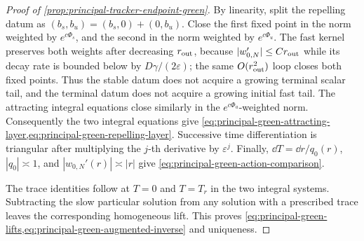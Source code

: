 \begin{proof}[Proof of \cref{prop:principal-tracker-endpoint-green}]
By linearity, split the repelling datum as
\((b_s,b_u)=(b_s,0)+(0,b_u)\).  Close the first fixed point in the norm
weighted by \(e^{c\Phi_s}\), and the second in the norm weighted by
\(e^{c\Phi_u}\).  The fast kernel preserves both weights after decreasing
\(r_{\rm out}\), because
\(|w_{0,N}'|\le C r_{\rm out}\) while its decay rate is bounded below by
\(D\gamma/(2\varepsilon)\); the same
\(O(r_{\rm out}^2)\) loop closes both fixed points.  Thus the stable datum
does not acquire a growing terminal scalar tail, and the terminal datum does
not acquire a growing initial fast tail.  The attracting integral equations
close similarly in the \(e^{c\Phi_a}\)-weighted norm.  Consequently the two
integral equations give
\cref{eq:principal-green-attracting-layer,eq:principal-green-repelling-layer}.
Successive time differentiation is triangular after multiplying the
\(j\)-th derivative by \(\varepsilon^j\).  Finally,
\(\dd T=\dd r/q_0(r)\), \(|q_0|\asymp1\), and
\(|w_{0,N}'(r)|\asymp|r|\) give
\cref{eq:principal-green-action-comparison}.

The trace identities follow at \(T=0\) and \(T=T_r\) in the two integral
systems.  Subtracting the slow particular solution from any solution with a
prescribed trace leaves the corresponding homogeneous lift.  This proves
\cref{eq:principal-green-lifts,eq:principal-green-augmented-inverse} and
uniqueness.
\end{proof}

